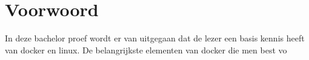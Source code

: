 \chapter*{Voorwoord}
\label{ch:voorwoord}


In deze bachelor proef  wordt er van uitgegaan dat de lezer een basis kennis heeft van docker en linux. De belangrijkste elementen van docker die men best vo


\tableofcontents



